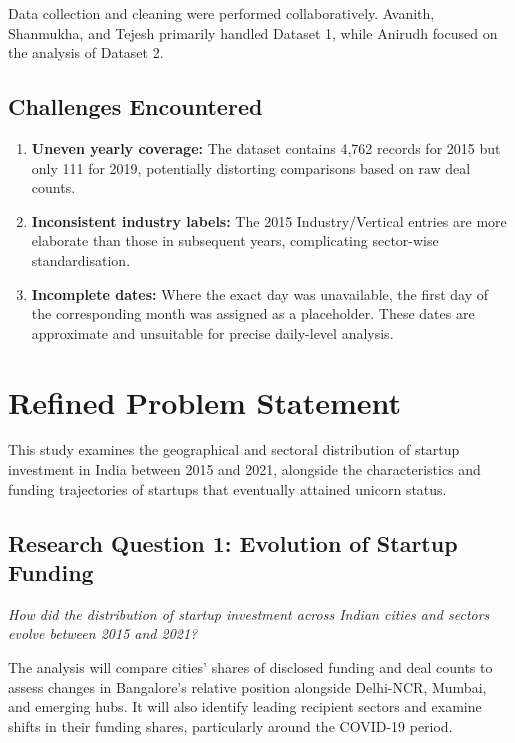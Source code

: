\documentclass[10pt,a4paper]{article}
\begin{document}
Data collection and cleaning were performed collaboratively.
Avanith, Shanmukha, and Tejesh primarily handled Dataset 1,
while Anirudh focused on the analysis of Dataset 2.

\subsection{Challenges Encountered}

\begin{enumerate}
    \item \textbf{Uneven yearly coverage:} The dataset contains
    4,762 records for 2015 but only 111 for 2019, potentially
    distorting comparisons based on raw deal counts.

    \item \textbf{Inconsistent industry labels:} The 2015
    Industry/Vertical entries are more elaborate than those in
    subsequent years, complicating sector-wise standardisation.

    \item \textbf{Incomplete dates:} Where the exact day was
    unavailable, the first day of the corresponding month was
    assigned as a placeholder. These dates are approximate and
    unsuitable for precise daily-level analysis.
\end{enumerate}


\newpage

\section{Refined Problem Statement}

This study examines the geographical and sectoral distribution
of startup investment in India between 2015 and 2021, alongside
the characteristics and funding trajectories of startups that
eventually attained unicorn status.

\subsection{Research Question 1: Evolution of Startup Funding}

\textit{How did the distribution of startup investment across
Indian cities and sectors evolve between 2015 and 2021?}

The analysis will compare cities' shares of disclosed funding
and deal counts to assess changes in Bangalore's relative position
alongside Delhi-NCR, Mumbai, and emerging hubs. It will also
identify leading recipient sectors and examine shifts in their
funding shares, particularly around the COVID-19 period.
\end{document}
